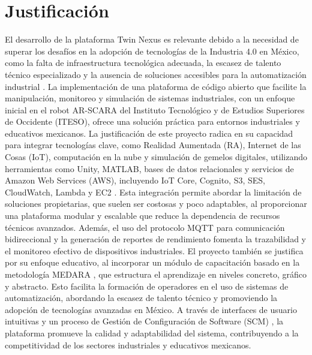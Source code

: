 \documentclass[12pt,letterpaper]{report}
\begin{document}
	\section{Justificación}
	El desarrollo de la plataforma Twin Nexus es relevante debido a la necesidad de superar los desafíos en la adopción de tecnologías de la Industria 4.0 en México, como la falta de infraestructura tecnológica adecuada, la escasez de talento técnico especializado y la ausencia de soluciones accesibles para la automatización industrial \cite{martinez_industria_mexico_2023}. La implementación de una plataforma de código abierto que facilite la manipulación, monitoreo y simulación de sistemas industriales, con un enfoque inicial en el robot AR-SCARA del Instituto Tecnológico y de Estudios Superiores de Occidente (ITESO), ofrece una solución práctica para entornos industriales y educativos mexicanos.
	La justificación de este proyecto radica en su capacidad para integrar tecnologías clave, como Realidad Aumentada (RA), Internet de las Cosas (IoT), computación en la nube y simulación de gemelos digitales, utilizando herramientas como Unity, MATLAB, bases de datos relacionales y servicios de Amazon Web Services (AWS), incluyendo IoT Core, Cognito, S3, SES, CloudWatch, Lambda y EC2 \cite{aws_iot_industrial_2024}. Esta integración permite abordar la limitación de soluciones propietarias, que suelen ser costosas y poco adaptables, al proporcionar una plataforma modular y escalable que reduce la dependencia de recursos técnicos avanzados. Además, el uso del protocolo MQTT para comunicación bidireccional y la generación de reportes de rendimiento fomenta la trazabilidad y el monitoreo efectivo de dispositivos industriales.
	El proyecto también se justifica por su enfoque educativo, al incorporar un módulo de capacitación basado en la metodología MEDARA \cite{zamora_medara_2022}, que estructura el aprendizaje en niveles concreto, gráfico y abstracto. Esto facilita la formación de operadores en el uso de sistemas de automatización, abordando la escasez de talento técnico y promoviendo la adopción de tecnologías avanzadas en México. A través de interfaces de usuario intuitivas y un proceso de Gestión de Configuración de Software (SCM) \cite{ieee_scm_std}, la plataforma promueve la calidad y adaptabilidad del sistema, contribuyendo a la competitividad de los sectores industriales y educativos mexicanos.
	
\end{document}
